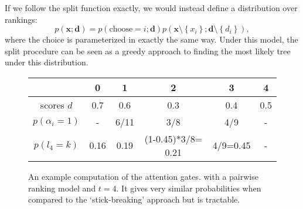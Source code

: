 \documentclass{article}
\newcommand\set[1]{\left\{#1\right\}}
\newcommand{\bd}{\mathbf{d}}
\newcommand{\bx}{\mathbf{x}}
\begin{document}
If we follow the split function exactly, we would instead define a distribution over rankings:
\begin{equation}
p(\bx;\bd) = p(\textrm{choose}= i; \bd)p(\bx\setminus\set{x_i}; \bd\setminus\set{d_i}),
\end{equation}
where the choice is parameterized in exactly the same way.
Under this model, the split procedure can be seen as a greedy approach to finding
the most likely tree under this distribution.

\begin{figure}
\centering
\begin{tabular}{|c|c|c|c|c|c|}
\hline
& 0 & 1 & 2 & 3 & 4\\
\hline
scores $d$         & 0.7 & 0.6 & 0.3 & 0.4 & 0.5\\
\hline
$p(\alpha_i=1)$    & - & 6/11 & 3/8 & 4/9 & -\\
\hline
$p(l_4=k)$ & 0.16 & 0.19 & (1-0.45)*3/8= 0.21 & 4/9=0.45 & -\\
\hline
\end{tabular}
\caption{An example computation of the attention gates.
with a pairwise ranking model and $t=4$.
It gives very similar probabilities when compared to the `stick-breaking' approach but is tractable.}
\label{fig:geom}
\end{figure}
\end{document}
